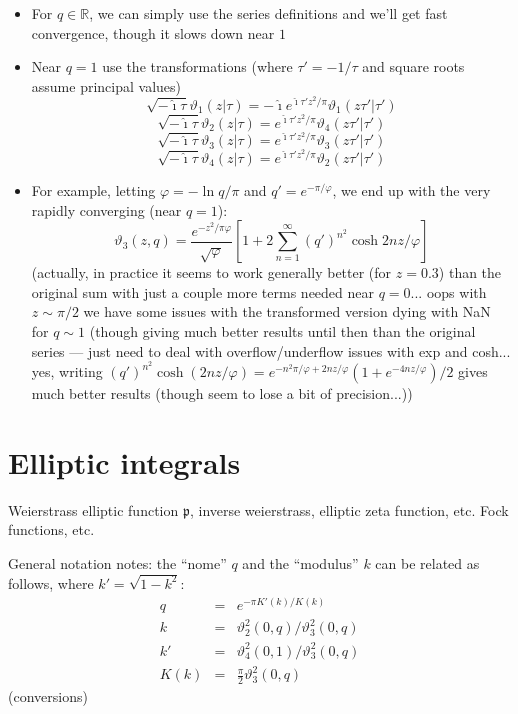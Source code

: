 \documentclass[10pt,dvipdfmx,letterpaper,twoside]{article}
\newcommand{\RR}{{\mathbb{R}}}
\newcommand{\ii}{{\hat{\imath}}}
\newenvironment{implementation}{\noindent\begin{framed}}{\end{framed}}
\let\theta=\vartheta
\let\phi=\varphi
\begin{document}
\begin{implementation}
\begin{itemize}
\item For $q\in\RR$, we can simply use the series definitions and we'll get fast convergence, though it slows down
  near $1$
\item Near $q=1$ use the transformations (where $\tau' = -1/\tau$ and square roots assume principal values)
  \[\sqrt{-\ii\tau} \theta_1(z|\tau) = -\ii e^{\ii\tau' z^2/\pi} \theta_1(z\tau'|\tau') \]
  \[\sqrt{-\ii\tau} \theta_2(z|\tau) = e^{\ii\tau' z^2/\pi} \theta_4(z\tau'|\tau') \]
  \[\sqrt{-\ii\tau} \theta_3(z|\tau) = e^{\ii\tau' z^2/\pi} \theta_3(z\tau'|\tau') \]
  \[\sqrt{-\ii\tau} \theta_4(z|\tau) = e^{\ii\tau' z^2/\pi} \theta_2(z\tau'|\tau') \]
\item For example, letting $\phi=-\ln q/\pi$ and $q'=e^{-\pi/\phi}$, we end up with the very rapidly converging (near $q=1$):
  \[ \theta_3(z,q) = \frac{e^{-z^2/\pi\phi}}{\sqrt\phi}\left[ 1 + 2\sum_{n=1}^\infty (q')^{n^2} \cosh 2nz/\phi \right] \]
  (actually, in practice it seems to work generally better (for $z=0.3$) than the original sum with just a couple more terms needed near $q=0$...
  oops with $z\sim\pi/2$ we have some issues with the transformed version dying with NaN for $q\sim1$ (though giving much better results until then
  than the original series --- just need to deal with overflow/underflow issues with exp and cosh...
  yes, writing $(q')^{n^2}\cosh(2nz/\phi) = e^{-n^2\pi/\phi + 2nz/\phi}(1 + e^{-4nz/\phi})/2$ gives much better results (though seem to lose a
  bit of precision...))
\end{itemize}
\end{implementation}

\section{Elliptic integrals}
Weierstrass elliptic function $\mathfrak{p}$, inverse weierstrass, elliptic zeta function, etc.
Fock functions, etc.

General notation notes: the ``nome'' $q$ and the ``modulus'' $k$ can be related as follows, where $k'=\sqrt{1-k^2}$:
\begin{eqnarray*}
q &=& e^{-\pi K'(k)/K(k)} \\
k &=& \theta_2^2(0,q) / \theta_3^2(0,q) \\
k' &=& \theta_4^2(0,1) / \theta_3^2(0,q) \\
K(k) &=& \frac{\pi}{2} \theta_3^2(0,q) 
\end{eqnarray*}
(conversions)
\end{document}
